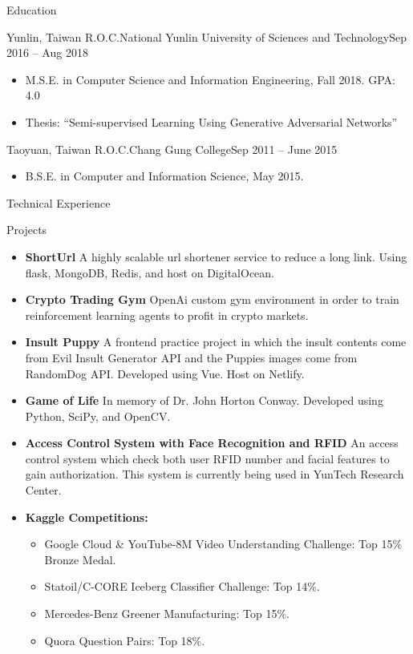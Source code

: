 \documentclass[]{mcdowellcv}
\begin{document}
	\begin{cvsection}{Education}
		\begin{cvsubsection}{Yunlin, Taiwan R.O.C.}{National Yunlin University of Sciences and Technology}{Sep 2016 -- Aug 2018}
			\bigskip
			\begin{itemize}
				\item M.S.E. in Computer Science and Information Engineering, Fall 2018.  GPA: 4.0
				\item Thesis: “Semi-supervised Learning Using Generative Adversarial Networks”
			\end{itemize}
		\end{cvsubsection}
		\begin{cvsubsection}{Taoyuan, Taiwan R.O.C.}{Chang Gung College}{Sep 2011 -- June 2015}
			\begin{itemize}
				\item B.S.E. in Computer and Information Science, May 2015. 
			\end{itemize}
		\end{cvsubsection}
	\end{cvsection}
	
	\begin{cvsection}{Technical Experience}
		\begin{cvsubsection}{Projects}{}{}
			\begin{itemize}
				\item \textbf{ShortUrl}  A highly scalable url shortener service to reduce a long link. Using flask, MongoDB, Redis, and host on DigitalOcean.
				\item \textbf{Crypto Trading Gym}  OpenAi custom gym environment in order to train reinforcement learning agents to profit in crypto markets.
				\item \textbf{Insult Puppy}  A frontend practice project in which the insult contents come from Evil Insult Generator API and the Puppies images come from RandomDog API. Developed using Vue. Host on Netlify.
				\item \textbf{Game of Life}  In memory of Dr. John Horton Conway. Developed using Python, SciPy, and OpenCV.
				\item \textbf{Access Control System with Face Recognition and RFID}  An access control system which check both user RFID number and facial features to gain authorization. This system is currently being used in YunTech Research Center.
				\item \textbf{Kaggle Competitions:}
					\begin{itemize}
						\item Google Cloud \& YouTube-8M Video Understanding Challenge: Top 15\% Bronze Medal.
						\item Statoil/C-CORE Iceberg Classifier Challenge: Top 14\%.
						\item Mercedes-Benz Greener Manufacturing: Top 15\%.
						\item Quora Question Pairs: Top 18\%.
					\end{itemize}
			\end{itemize}
		\end{cvsubsection}
	\end{cvsection}
	
\end{document}
